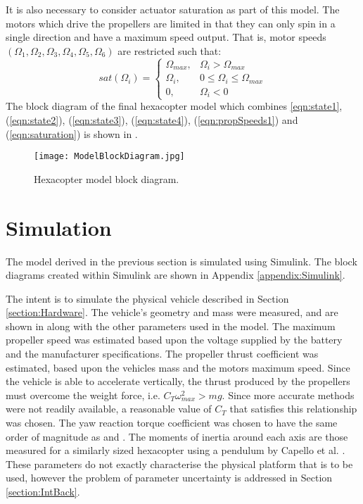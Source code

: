 It is also necessary to consider actuator saturation as part of this model. The motors which drive the propellers are limited in that they can only spin in a single direction and have a maximum speed output. That is, motor speeds $(\Omega_{1},\Omega_{2},\Omega_{3},\Omega_{4},\Omega_{5},\Omega_{6})$ are restricted such that:
\begin{equation}\label{eqn:saturation}
sat(\Omega_{i})=\begin{cases}
      \Omega_{max}, & \Omega_{i}>\Omega_{max}\\
      \Omega_{i}, & 0\leq\Omega_{i}\leq\Omega_{max}\\
      0, & \Omega_{i}<0
    \end{cases} 
\end{equation}
The block diagram of the final hexacopter model which combines \eqref{eqn:state1}, (\ref{eqn:state2}), (\ref{eqn:state3}), (\ref{eqn:state4}), (\ref{eqn:propSpeeds1}) and (\ref{eqn:saturation}) is shown in .
\begin{figure}[htb]
\begin{center}
	\texttt{[image: ModelBlockDiagram.jpg]}%
	\end{center}
	\caption{Hexacopter model block diagram.}%
	\label{fig:FinalModel}%
\end{figure}

 
\section{Simulation}
The model derived in the previous section is simulated using Simulink. The block diagrams created within Simulink are shown in Appendix \ref{appendix:Simulink}.

The intent is to simulate the physical vehicle described in Section \ref{section:Hardware}. The vehicle's geometry and mass were measured, and are shown in  along with the other parameters used in the model. The maximum propeller speed was estimated based upon the voltage supplied by the battery and the manufacturer specifications. The propeller thrust coefficient was estimated, based upon the vehicles mass and the motors maximum speed. Since the vehicle is able to accelerate vertically, the thrust produced by the propellers must overcome the weight force, i.e. $C_{T}\omega_{max}^{2}>mg$. Since more accurate methods were not readily available, a reasonable value of $C_{T}$ that satisfies this relationship was chosen. The yaw reaction torque coefficient was chosen to have the same order of magnitude as \cite{Bouabdallah2006} and \cite{Tayebi2004}. The moments of inertia around each axis are those measured for a similarly sized hexacopter using a pendulum by Capello et al. \cite{Capello2015}. These parameters do not exactly characterise the physical platform that is to be used, however the problem of parameter uncertainty is addressed in Section \ref{section:IntBack}.

